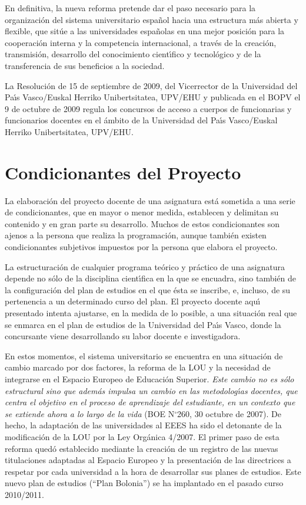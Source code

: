 En definitiva, la nueva reforma pretende dar el paso necesario para 
la organizaci\'{o}n del sistema universitario espa\~{n}ol hacia una
 estructura m\'{a}s abierta y flexible, que sit\'{u}e a las universidades
 espa\~{n}olas en una mejor posici\'{o}n para la cooperaci\'{o}n interna
 y la competencia internacional, a trav\'{e}s de la creaci\'{o}n,
 transmisi\'{o}n, desarrollo del conocimiento cient\'{\i}fico y 
tecnol\'{o}gico y de la transferencia de sus beneficios a la sociedad.



La Resoluci\'{o}n de 15 de septiembre de 2009, del Vicerrector de la  
Universidad del Pa\'{\i}s Vasco/Euskal Herriko Unibertsitatea, UPV/EHU	y publicada en el BOPV el 9 de octubre de 2009 regula los concursos de acceso a cuerpos de 
funcionarias y funcionarios docentes en el \'{a}mbito de la
 Universidad del Pa\'{\i}s Vasco/Euskal Herriko Unibertsitatea, UPV/EHU.



\newpage
\section{Condicionantes del Proyecto}
La elaboraci\'{o}n del proyecto docente de una asignatura est\'{a} sometida
 a una serie de condicionantes, que en mayor o menor medida, 
establecen y delimitan su contenido y en gran parte su desarrollo. 
Muchos de estos condicionantes son ajenos a la persona que realiza la
 programaci\'{o}n, aunque  tambi\'{e}n
 existen condicionantes subjetivos impuestos por la persona que 
elabora el proyecto.

La estructuraci\'{o}n de cualquier programa te\'{o}rico y pr\'{a}ctico
 de una asignatura depende no s\'{o}lo  de la disciplina cient\'{\i}fica
 en la que se encuadra, sino tambi\'{e}n de la configuraci\'{o}n del plan de
 estudios en el que \'{e}sta se inscribe, e, incluso, de su pertenencia a
 un determinado curso del plan. El proyecto docente aqu\'{\i} presentado 
intenta ajustarse, en la medida de lo posible, a una situaci\'{o}n real 
que se enmarca en el plan de estudios de la Universidad del Pa\'{\i}s Vasco, 
donde la concursante viene desarrollando su labor docente e investigadora.


En estos momentos, el sistema universitario se encuentra en una
 situaci\'{o}n de cambio marcado por dos factores, la reforma de la LOU
 y la necesidad de integrarse en el Espacio Europeo de Educaci\'{o}n Superior.
{\it Este cambio no es s\'{o}lo  estructural sino que adem\'{a}s impulsa
un cambio en las metodolog\'{\i}as docentes,
 que centra el objetivo en el proceso
de aprendizaje del estudiante, en un contexto que se extiende
ahora a lo largo de la vida}  (BOE N{$^\circ$}260, 30 octubre de 2007).
De hecho, la adaptaci\'{o}n de las universidades al EEES ha sido el 
detonante de la modificaci\'{o}n de la LOU por la Ley Org\'{a}nica 4/2007.
 El primer paso de esta reforma qued\'{o} establecido mediante la 
creaci\'{o}n de un registro de las nuevas titulaciones adaptadas al Espacio 
Europeo y la presentaci\'{o}n de las directrices a respetar por 
cada universidad a la hora de desarrollar sus planes de estudios.
Este nuevo plan de estudios (``Plan Bolonia'') se ha implantado  
en el  pasado curso 2010/2011.


